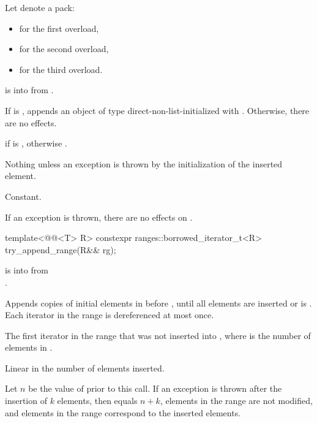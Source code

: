 \begin{itemdescr}
\pnum
Let  denote a pack:
\begin{itemize}
\item {} for the first overload,
\item {} for the second overload,
\item {} for the third overload.
\end{itemize}

\pnum
\expects
{} is 
into  from .

\pnum
\effects
If  is ,
appends an object of type 
direct-non-list-initialized with .
Otherwise, there are no effects.

\pnum
\returns
{} if  is ,
otherwise .

\pnum
\throws
Nothing unless an exception is thrown by the initialization of the inserted element.

\pnum
\complexity
Constant.

\pnum
\remarks
If an exception is thrown, there are no effects on .
\end{itemdescr}

%
\begin{itemdecl}
template<@@<T> R>
  constexpr ranges::borrowed_iterator_t<R> try_append_range(R&& rg);
\end{itemdecl}

\begin{itemdescr}
\pnum
\expects
{} is 
into  from\\.

\pnum
\effects
Appends copies of initial elements in  before ,
until all elements are inserted or  is .
Each iterator in the range  is dereferenced at most once.

\pnum
\returns
The first iterator in the range
that was not inserted into ,
where  is the number of elements in .

\pnum
\complexity
Linear in the number of elements inserted.

\pnum
\remarks
Let $n$ be the value of  prior to this call.
If an exception is thrown after the insertion of $k$ elements, then
 equals $n + k$,
elements in the range  are not modified, and
elements in the range  correspond to
the inserted elements.
\end{itemdescr}


